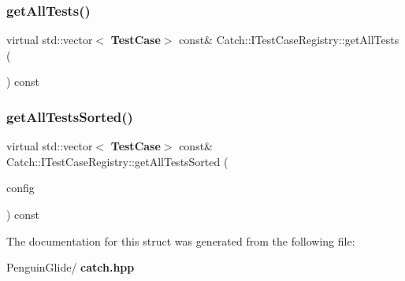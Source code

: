 \subsubsection{getAllTests()}
{\footnotesize\ttfamily virtual std\+::vector$<$\textbf{ Test\+Case}$>$ const\& Catch\+::\+I\+Test\+Case\+Registry\+::get\+All\+Tests (\begin{DoxyParamCaption}{ }\end{DoxyParamCaption}) const\hspace{0.3cm}{\ttfamily [pure virtual]}}

\mbox{\label{struct_catch_1_1_i_test_case_registry_a33e46639d0319d35497c05bb5d02be5a}} 
\subsubsection{getAllTestsSorted()}
{\footnotesize\ttfamily virtual std\+::vector$<$\textbf{ Test\+Case}$>$ const\& Catch\+::\+I\+Test\+Case\+Registry\+::get\+All\+Tests\+Sorted (\begin{DoxyParamCaption}\item[{\textbf{ I\+Config} const \&}]{config }\end{DoxyParamCaption}) const\hspace{0.3cm}{\ttfamily [pure virtual]}}



The documentation for this struct was generated from the following file\+:\begin{DoxyCompactItemize}
\item 
Penguin\+Glide/\textbf{ catch.\+hpp}\end{DoxyCompactItemize}

